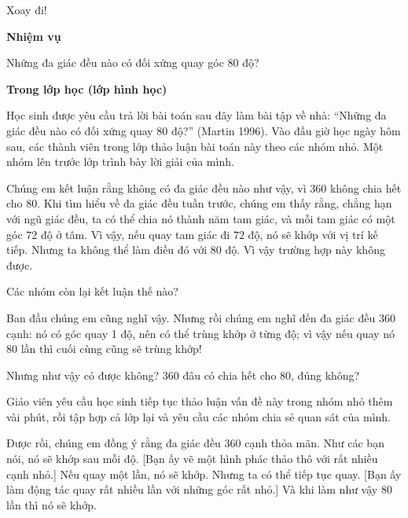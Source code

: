   {
    Xoay đi!
  }
  {
    \textbf{Nhiệm vụ}

    Những đa giác đều nào có đối xứng quay góc 80 độ?

    \textbf{Trong lớp học (lớp hình học)}

    Học sinh được yêu cầu trả lời bài toán sau đây làm bài tập về nhà: ``Những đa giác đều nào có đối xứng quay 80 độ?'' (Martin 1996). Vào đầu giờ học ngày hôm sau, các thành viên trong lớp thảo luận bài toán này theo các nhóm nhỏ. Một nhóm lên trước lớp trình bày lời giải của mình.

    \begin{scriptlist}
      \item [Học sinh 1:] Chúng em kết luận rằng không có đa giác đều nào như vậy, vì $360$ không chia hết cho $80$. Khi tìm hiểu về đa giác đều tuần trước, chúng em thấy rằng, chẳng hạn với ngũ giác đều, ta có thể chia nó thành năm tam giác, và mỗi tam giác có một góc $72$ độ ở tâm. Vì vậy, nếu quay tam giác đi $72$ độ, nó sẽ khớp với vị trí kế tiếp. Nhưng ta không thể làm điều đó với $80$ độ. Vì vậy trường hợp này không được.

      \item [Giáo viên:] Các nhóm còn lại kết luận thế nào?

      \item [Học sinh 2:] Ban đầu chúng em cũng nghĩ vậy. Nhưng rồi chúng em nghĩ đến đa giác đều 360 cạnh: nó có góc quay 1 độ, nên có thể trùng khớp ở từng độ; vì vậy nếu quay nó $80$ lần thì cuối cùng cũng sẽ trùng khớp!

      \item [Học sinh 1:] Nhưng như vậy có được không? $360$ đâu có chia hết cho $80$, đúng không?
    \end{scriptlist}

    Giáo viên yêu cầu học sinh tiếp tục thảo luận vấn đề này trong nhóm nhỏ thêm vài phút, rồi tập hợp cả lớp lại và yêu cầu các nhóm chia sẻ quan sát của mình.\vspace{\baselineskip}

    \begin{scriptlist}
      \item [Học sinh 3:] Được rồi, chúng em đồng ý rằng đa giác đều 360 cạnh thỏa mãn. Như các bạn nói, nó sẽ khớp sau mỗi độ. [Bạn ấy vẽ một hình phác thảo thô với rất nhiều cạnh nhỏ.] Nếu quay một lần, nó sẽ khớp. Nhưng ta có thể tiếp tục quay. [Bạn ấy làm động tác quay rất nhiều lần với những góc rất nhỏ.] Và khi làm như vậy $80$ lần thì nó sẽ khớp.


\end{scriptlist}}
